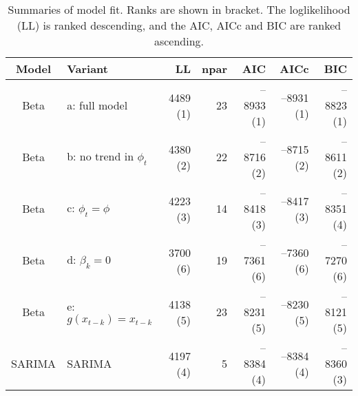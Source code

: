 \begin{table}[ht]
\centering
\begin{tabular}{cl|rrrrr}
  \hline
Model & Variant & LL & npar & AIC & AICc & BIC \\ 
  \hline
Beta & a: full model & 4489 (1) & 23 & --8933 (1) & --8931 (1) & --8823 (1) \\ 
  Beta & b: no trend in $\phi_t$ & 4380 (2) & 22 & --8716 (2) & --8715 (2) & --8611 (2) \\ 
  Beta & c: $\phi_t = \phi$ & 4223 (3) & 14 & --8418 (3) & --8417 (3) & --8351 (4) \\ 
  Beta & d: $\beta_k = 0$ & 3700 (6) & 19 & --7361 (6) & --7360 (6) & --7270 (6) \\ 
  Beta & e: $g(x_{t-k}) = x_{t-k}$ & 4138 (5) & 23 & --8231 (5) & --8230 (5) & --8121 (5) \\ 
   \hline
SARIMA & SARIMA & 4197 (4) & 5 & --8384 (4) & --8384 (4) & --8360 (3) \\ 
   \hline
\end{tabular}
\caption{Summaries of model fit. 
             Ranks are shown in bracket. 
             The loglikelihood (LL) is ranked descending, 
             and the AIC, AICc and BIC are ranked ascending.} 
\label{tab:wILIsum}
\end{table}

